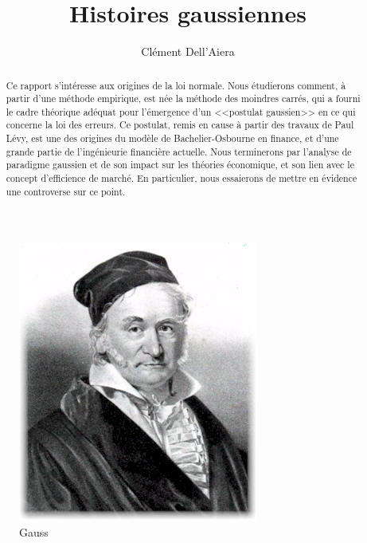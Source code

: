 \documentclass{article}
\title{Histoires gaussiennes }
\date{}
\author{ Clément Dell'Aiera}
\begin{document}
\maketitle

\begin{figure}[!h]\centering
\includegraphics[scale=0.4]{Gauss2.jpg}
\caption{Gauss}
\label{fig:Gauss2}
\end{figure}

\newpage
\tableofcontents

\newpage


\begin{abstract}
Ce rapport s'intéresse aux origines de la loi normale. Nous étudierons comment, à partir d'une méthode empirique, est née la méthode des moindres carrés, qui a fourni le cadre théorique adéquat pour l'émergence d'un <<postulat gaussien>> en ce qui concerne la loi des erreurs. Ce postulat, remis en cause à partir des travaux de Paul Lévy, est une des origines du modèle de Bachelier-Osbourne en finance, et d'une grande partie de l'ingénieurie financière actuelle. Nous terminerons par l'analyse de paradigme gaussien et de son impact sur les théories économique, et son lien avec le concept d'efficience de marché. En particulier, nous essaierons de mettre en évidence une controverse sur ce point.
\end{abstract}
\end{document}
